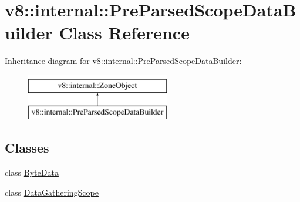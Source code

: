 \hypertarget{classv8_1_1internal_1_1PreParsedScopeDataBuilder}{}\section{v8\+:\+:internal\+:\+:Pre\+Parsed\+Scope\+Data\+Builder Class Reference}
\label{classv8_1_1internal_1_1PreParsedScopeDataBuilder}
Inheritance diagram for v8\+:\+:internal\+:\+:Pre\+Parsed\+Scope\+Data\+Builder\+:\begin{figure}[H]
\begin{center}
\leavevmode
\includegraphics[height=2.000000cm]{classv8_1_1internal_1_1PreParsedScopeDataBuilder}
\end{center}
\end{figure}
\subsection*{Classes}
\begin{DoxyCompactItemize}
\item 
class \mbox{\hyperlink{classv8_1_1internal_1_1PreParsedScopeDataBuilder_1_1ByteData}{Byte\+Data}}
\item 
class \mbox{\hyperlink{classv8_1_1internal_1_1PreParsedScopeDataBuilder_1_1DataGatheringScope}{Data\+Gathering\+Scope}}
\end{DoxyCompactItemize}
